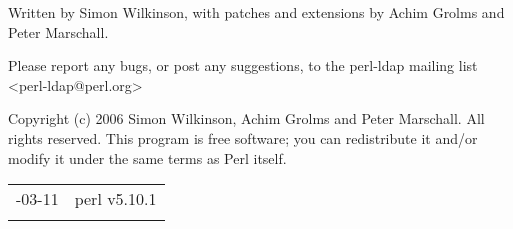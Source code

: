 \documentclass[]{article}
\begin{document}

Written by Simon Wilkinson, with patches and extensions by Achim Grolms
and Peter Marschall.

Please report any bugs, or post any suggestions, to the perl-ldap
mailing list \textless{}perl-ldap@perl.org\textgreater{}


Copyright (c) 2006 Simon Wilkinson, Achim Grolms and Peter Marschall.
All rights reserved. This program is free software; you can redistribute
it and/or modify it under the same terms as Perl itself.

\begin{longtable}[c]{@{}ll@{}}
\toprule\addlinespace
2010-03-11 & perl v5.10.1
\\\addlinespace
\bottomrule
\end{longtable}
\end{document}
